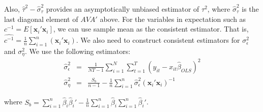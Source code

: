 Also, $\widehat{\tau}^2 - \widehat{\sigma}_\tau^2$ provides an asymptotically unbiased estimator of $\tau^2$, where $\widehat{\sigma}_\tau^2$ is the last diagonal element of $AVA'$ above. 
For the variables in expectation such as $c^{-1} = E[\mathbf{x}_i'\mathbf{x}_i]$, we can use sample mean as the consistent estimator. That is, $\widehat{c^{-1}} =  \frac{1}{n} \sum_{i=1}^n (\mathbf{x}_i'\mathbf{x}_i) $. We also need to construct consistent estimators for $\sigma_\epsilon^2$ and $\sigma_\eta^2$. We use the following estimators:
\begin{eqnarray}
\widehat{\sigma}_\epsilon^2 &=& \frac{1}{NT - 1} \sum_{i=1}^N \sum_{t=1}^T (y_{it}-x_{it}\widehat{\beta}_{OLS})^2\\
\widehat{\sigma}_\eta^2 &=& \frac{S_b}{n-1} -\frac{1}{n} \sum_{i=1}^n \widehat{\sigma}_\epsilon^2 (\mathbf{x}_i'\mathbf{x}_i)^{-1} 
\end{eqnarray}

where $S_b = \sum_{i=1}^n \widehat{\beta}_i \widehat{\beta}_i' - \frac{1}{n} \sum_{i=1}^n \widehat{\beta}_i \sum_{i=1}^n \widehat{\beta}_i'$. 

